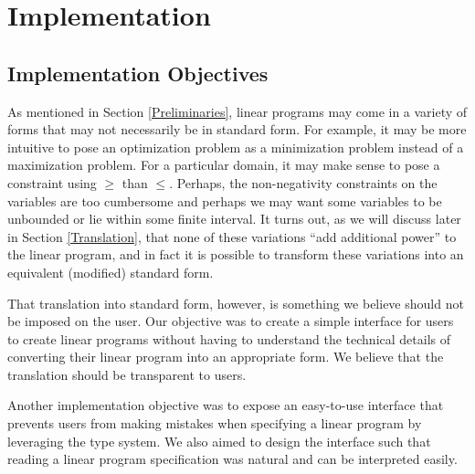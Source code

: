 \documentclass{article}
\begin{document}
\section{Implementation} \label{Implementation}
\subsection{Implementation Objectives}
As mentioned in Section \ref{Preliminaries}, linear programs may come in a variety of forms that may not necessarily be in standard form. For example, it may be more intuitive to pose an optimization problem as a minimization problem instead of a maximization problem. For a particular domain, it may make sense to pose a constraint using $\geq$ than $\leq$. Perhaps, the non-negativity constraints on the variables are too cumbersome and perhaps we may want some variables to be unbounded or lie within some finite interval. It turns out, as we will discuss later in Section \ref{Translation}, that none of these variations ``add additional power'' to the linear program, and in fact it is possible to transform these variations into an equivalent (modified) standard form. 

That translation into standard form, however, is something we believe should not be imposed on the user. Our objective was to create a simple interface for users to create linear programs without having to understand the technical details of converting their linear program into an appropriate form. We believe that the translation should be transparent to users. 

Another implementation objective was to expose an easy-to-use interface that prevents users from making mistakes when specifying a linear program by leveraging the type system. We also aimed to design the interface such that reading a linear program specification was natural and can be interpreted easily. 
\end{document}

